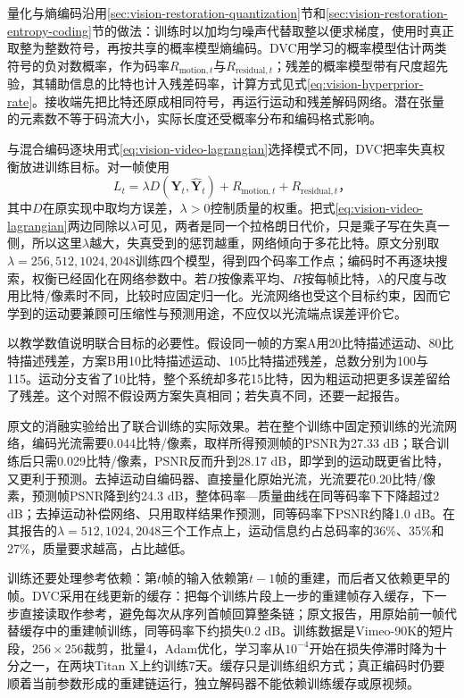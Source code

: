 量化与熵编码沿用\ref{sec:vision-restoration-quantization}节和\ref{sec:vision-restoration-entropy-coding}节的做法：训练时以加均匀噪声代替取整以便求梯度，使用时真正取整为整数符号，再按共享的概率模型熵编码。DVC用学习的概率模型估计两类符号的负对数概率，作为码率$R_{\mathrm{motion},t}$与$R_{\mathrm{residual},t}$；残差的概率模型带有尺度超先验，其辅助信息的比特也计入残差码率，计算方式见式\eqref{eq:vision-hyperprior-rate}。接收端先把比特还原成相同符号，再运行运动和残差解码网络。潜在张量的元素数不等于码流大小，实际长度还受概率分布和编码格式影响。

与混合编码逐块用式\eqref{eq:vision-video-lagrangian}选择模式不同，DVC把率失真权衡放进训练目标。对一帧使用
\begin{equation}
  L_t=\lambda D(\bm{Y}_t,\widehat{\bm{Y}}_t)
       +R_{\mathrm{motion},t}+R_{\mathrm{residual},t}\text{，}
  \label{eq:vision-video-rate-distortion}
\end{equation}
其中$D$在原实现中取均方误差，$\lambda>0$控制质量的权重。把式\eqref{eq:vision-video-lagrangian}两边同除以$\lambda$可见，两者是同一个拉格朗日代价，只是乘子写在失真一侧，所以这里$\lambda$越大，失真受到的惩罚越重，网络倾向于多花比特。原文分别取$\lambda=256,512,1024,2048$训练四个模型，得到四个码率工作点；编码时不再逐块搜索，权衡已经固化在网络参数中。若$D$按像素平均、$R$按每帧比特，$\lambda$的尺度与改用比特/像素时不同，比较时应固定归一化。光流网络也受这个目标约束，因而它学到的运动要兼顾可压缩性与预测用途，不应仅以光流端点误差评价它。

以教学数值说明联合目标的必要性。假设同一帧的方案A用20比特描述运动、80比特描述残差，方案B用10比特描述运动、105比特描述残差，总数分别为100与115。运动分支省了10比特，整个系统却多花15比特，因为粗运动把更多误差留给了残差。这个对照不假设两方案失真相同；若失真不同，还要一起报告。

原文的消融实验给出了联合训练的实际效果。若在整个训练中固定预训练的光流网络，编码光流需要0.044比特/像素，取样所得预测帧的PSNR为27.33 dB；联合训练后只需0.029比特/像素，PSNR反而升到28.17 dB，即学到的运动既更省比特，又更利于预测。去掉运动自编码器、直接量化原始光流，光流要花0.20比特/像素，预测帧PSNR降到约24.3 dB，整体码率—质量曲线在同等码率下下降超过2 dB；去掉运动补偿网络、只用取样结果作预测，同等码率下PSNR约降1.0 dB。在其报告的$\lambda=512,1024,2048$三个工作点上，运动信息约占总码率的36\%、35\%和27\%，质量要求越高，占比越低。

训练还要处理参考依赖：第$t$帧的输入依赖第$t-1$帧的重建，而后者又依赖更早的帧。DVC采用在线更新的缓存：把每个训练片段上一步的重建帧存入缓存，下一步直接读取作参考，避免每次从序列首帧回算整条链；原文报告，用原始前一帧代替缓存中的重建帧训练，同等码率下约损失0.2 dB。训练数据是Vimeo-90K的短片段，$256\times256$裁剪，批量4，Adam优化，学习率从$10^{-4}$开始在损失停滞时降为十分之一，在两块Titan X上约训练7天。缓存只是训练组织方式；真正编码时仍要顺着当前参数形成的重建链运行，独立解码器不能依赖训练缓存或原视频。

